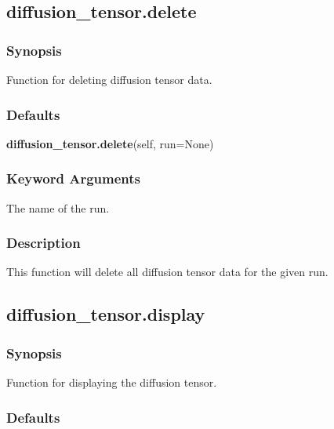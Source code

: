 


\newpage

\subsection{diffusion\_tensor.delete}


\subsubsection{Synopsis}

Function for deleting diffusion tensor data.



\subsubsection{Defaults}

\textsf{\textbf{diffusion\_tensor.delete}(self, run=None)}


\subsubsection{Keyword Arguments}

  The name of the run. 




\subsubsection{Description}

This function will delete all diffusion tensor data for the given run.




\newpage

\subsection{diffusion\_tensor.display}


\subsubsection{Synopsis}

Function for displaying the diffusion tensor.



\subsubsection{Defaults}

